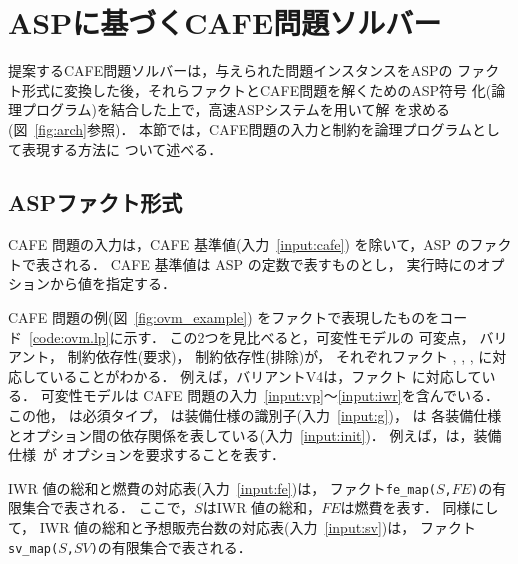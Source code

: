 \section{ASPに基づくCAFE問題ソルバー}

提案するCAFE問題ソルバーは，与えられた問題インスタンスをASPの
ファクト形式に変換した後，それらファクトとCAFE問題を解くためのASP符号
化(論理プログラム)を結合した上で，高速ASPシステム{\clingo}を用いて解
を求める(図~\ref{fig:arch}参照)．
本節では，CAFE問題の入力と制約を論理プログラムとして表現する方法に
ついて述べる．

\subsection{ASPファクト形式}

 

CAFE 問題の入力は，CAFE 基準値(入力~\ref{input:cafe})
を除いて，ASP のファクトで表される．
CAFE 基準値は ASP の定数で表すものとし，
実行時に{\clingo}のオプションから値を指定する．

CAFE 問題の例(図~\ref{fig:ovm_example})
をファクトで表現したものをコード~\ref{code:ovm.lp}に示す．
この2つを見比べると，可変性モデルの
可変点，
バリアント，
制約依存性(要求)，
制約依存性(排除)が，
それぞれファクト
, 
,
,
に対応していることがわかる．
例えば，バリアント\textsf{V4}は，ファクト
に対応している．
%
可変性モデルは CAFE 問題の入力~\ref{input:vp}〜\ref{input:iwr}を含んでいる．
%
この他，
は必須タイプ，
は装備仕様の識別子(入力~\ref{input:g})，
は
各装備仕様とオプション間の依存関係を表している(入力~\ref{input:init})．
例えば，は，装備仕様~が
オプションを要求することを表す．

IWR 値の総和と燃費の対応表(入力~\ref{input:fe})は，
ファクト\texttt{fe\_map($S$,$FE$)}の有限集合で表される．
ここで，$S$はIWR 値の総和，$FE$は燃費を表す．
同様にして，
IWR 値の総和と予想販売台数の対応表(入力~\ref{input:sv})は，
ファクト\texttt{sv\_map($S$,$SV$)}の有限集合で表される．


